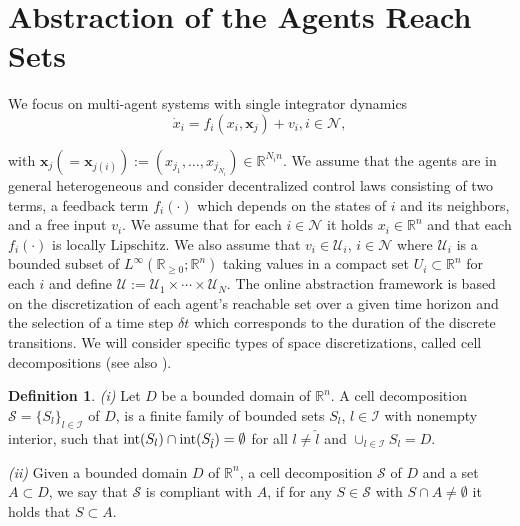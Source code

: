 \documentclass[reqno]{amsart}
\theoremstyle{plain}
\theoremstyle{definition}
\newtheorem{dfn}[thm]{Definition}
\numberwithin{equation}{section}
\begin{document}
\section{Abstraction of the Agents Reach Sets}

We focus on multi-agent systems with single integrator dynamics
\begin{equation}\label{single:integrator}
\dot{x}_{i}=f_{i}(x_{i},{\textbf{{x}}}_j)+v_{i}, i\in{\ensuremath{\mathcal{N}}},
\end{equation}

\noindent with ${\textbf{{x}}}_j(={\textbf{{x}}}_{j(i)}):=(x_{j_{1}},\ldots,x_{j_{N_i}})\in{\ensuremath{\mathbb{R}^{{N_i n}}}}$. We assume that the agents are in general heterogeneous and consider  decentralized control laws consisting of two terms, a feedback term $f_{i}(\cdot)$ which depends on the states of $i$ and its neighbors, and a free input $v_{i}$. We assume that for each $i\in{\ensuremath{\mathcal{N}}}$ it holds $x_{i}\in {\ensuremath{\mathbb{R}^{{n}}}}$ and that each $f_{i}(\cdot)$ is locally Lipschitz. We also assume that $v_{i}\in\mathcal{U}_{i}$, $i\in{\ensuremath{\mathcal{N}}}$ where $\mathcal{U}_{i}$ is a bounded subset of $L^{\infty}({\ensuremath{\mathbb{R}_{ \geq 0}}};{\ensuremath{\mathbb{R}^{{n}}}})$ taking values in a compact set $U_i\subset{\ensuremath{\mathbb{R}^{{n}}}}$ for each $i$ and define $\mathcal{U}:=\mathcal{U}_{1}\times\cdots\times\mathcal{U}_{N}$. The online abstraction framework is based on the discretization of each agent's reachable set over a given time horizon and the selection of a time step $\delta t$ which corresponds to the duration of the discrete transitions. We will consider specific types of space discretizations, called cell decompositions (see also \cite{Gl02}).

\begin{dfn} \label{cell:decomposition}
\textit{(i)} Let $D$ be a bounded domain of ${\ensuremath{\mathbb{R}^{{n}}}}$. A cell decomposition $\mathcal{S}=\{S_{l}\}_{l\in\mathcal{I}}$ of $D$, is a finite family of bounded sets $S_{l}$, $l\in\mathcal{I}$ with nonempty interior, such that ${\rm int}(S_{l})\cap {\rm int}(S_{\hat{l}})=\emptyset$ for all $l\ne\hat{l}$ and $\cup_{l\in\mathcal{I}} S_{l}=D$. 

\noindent \textit{(ii)} Given a bounded domain $D$ of ${\ensuremath{\mathbb{R}^{{n}}}}$, a cell decomposition ${\ensuremath{\mathcal{S}}}$ of $D$ and a set $A\subset D$, we say that ${\ensuremath{\mathcal{S}}}$ is compliant with $A$, if for any $S\in{\ensuremath{\mathcal{S}}}$ with $S\cap A\ne \emptyset$ it holds that $S\subset A$.
\end{dfn}
\end{document}
